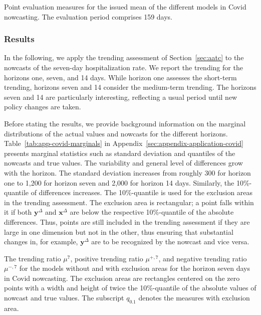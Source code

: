 \documentclass[pdflatex]{sn-jnl}
\theoremstyle{plain}%
\theoremstyle{definition}
\newcommand{\diffx}{\mathbf{x}^{\Delta}}
\newcommand{\diffy}{\mathbf{y}^{\Delta}}
\newcommand{\acc}{\mu}
\newcommand{\accl}[1][l]{\mu^{#1}}
\newcommand{\accpl}[1][l]{\acc^{+,#1}}
\newcommand{\accml}[1][l]{\acc^{-,#1}}
\begin{document}
\begin{table}[]
    \centering
    
    \caption[Point evaluation measures for the issued mean of the different models in Covid nowcasting.]{Point evaluation measures for the issued mean of the different models in Covid nowcasting. The evaluation period comprises 159 days. }
    \label{tab:app-covid-rmse}
\end{table}

\subsubsection*{Results}

In the following, we apply the trending assessment of Section~\ref{sec:aatc} to the nowcasts of the seven-day hospitalization rate.
We report the trending for the horizons one, seven, and 14 days.
While horizon one assesses the short-term trending, horizons seven and 14 consider the medium-term trending.
The horizons seven and 14 are particularly interesting, reflecting a usual period until new policy changes are taken.

Before stating the results, we provide background information on the marginal distributions of the actual values and nowcasts for the different horizons.
Table~\ref{tab:app-covid-marginals} in Appendix~\ref{sec:appendix-application-covid} presents marginal statistics such as standard deviation and quantiles of the nowcasts and true values.
The variability and general level of differences grow with the horizon.
The standard deviation increases from roughly 300 for horizon one to 1,200 for horizon seven and 2,000 for horizon 14 days.
Similarly, the 10\%-quantile of differences increases.
The 10\%-quantile is used for the exclusion areas in the trending assessment.
The exclusion area is rectangular; a point falls within it if both $\diffy$ and $\diffx$ are below the respective 10\%-quantile of the absolute differences.
Thus, points are still included in the trending assessment if they are large in one dimension but not in the other, thus ensuring that substantial changes in, for example, $\diffy$ are to be recognized by the nowcast and vice versa.

\begin{table}
    \centering
    \tiny
    
    \caption[The trending ratios for Covid nowcasting.]{The trending ratio $\accl[7]$, positive trending ratio $\accpl[7]$, and negative trending ratio $\accml[7]$ for the models without and with exclusion areas for the horizon seven days in Covid nowcasting. The exclusion areas are rectangles centered on the zero points with a width and height of twice the 10\%-quantile of the absolute values of nowcast and true values. The subscript $q_{0.1}$ denotes the measures with exclusion area. }
    \label{tab:app-covid-trending-ratios-lag-7}
\end{table}
\end{document}
